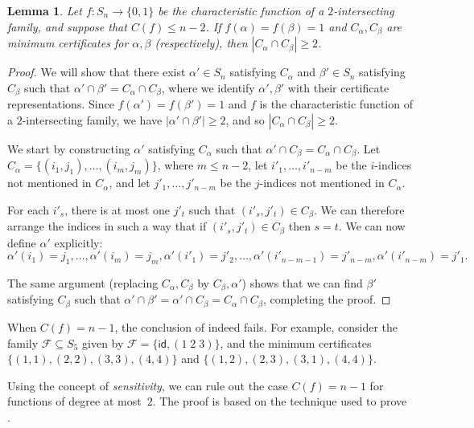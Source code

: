 \documentclass{article}
\newtheorem{lemma}[theorem]{Lemma}
\theoremstyle{definition}
\providecommand{\id}{\mathsf{id}}
\begin{document}
\begin{lemma} \label{lem:2-int-coset-sym}
Let $f\colon S_n \to \{0,1\}$ be the characteristic function of a $2$-intersecting family, and suppose that $C(f) \leq n-2$. If $f(\alpha) = f(\beta) = 1$ and $C_\alpha,C_\beta$ are minimum certificates for $\alpha,\beta$ (respectively), then $|C_\alpha \cap C_\beta| \geq 2$.
\end{lemma}
\begin{proof}
We will show that there exist $\alpha' \in S_n$ satisfying $C_\alpha$ and $\beta' \in S_n$ satisfying $C_\beta$ such that $\alpha' \cap \beta' = C_\alpha \cap C_\beta$, where we identify $\alpha',\beta'$ with their certificate representations. Since $f(\alpha') = f(\beta') = 1$ and $f$ is the characteristic function of a $2$-intersecting family, we have $|\alpha' \cap \beta'| \geq 2$, and so $|C_\alpha \cap C_\beta| \geq 2$.

We start by constructing $\alpha'$ satisfying $C_\alpha$ such that $\alpha' \cap C_\beta = C_\alpha \cap C_\beta$. Let $C_\alpha = \{(i_1,j_1),\ldots,(i_m,j_m)\}$, where $m \leq n-2$, let $i'_1,\ldots,i'_{n-m}$ be the $i$-indices not mentioned in $C_\alpha$, and let $j'_1,\ldots,j'_{n-m}$ be the $j$-indices not mentioned in $C_\alpha$.

For each $i'_s$, there is at most one $j'_t$ such that $(i'_s,j'_t) \in C_\beta$. We can therefore arrange the indices in such a way that if $(i'_s,j'_t) \in C_\beta$ then $s = t$. We can now define $\alpha'$ explicitly:
\[
 \alpha'(i_1) = j_1, \ldots, \alpha'(i_m) = j_m,
 \alpha'(i'_1) = j'_2, \ldots, \alpha'(i'_{n-m-1}) = j'_{n-m}, \alpha'(i'_{n-m}) = j'_1.
\]

The same argument (replacing $C_\alpha,C_\beta$ by $C_\beta,\alpha'$) shows that we can find $\beta'$ satisfying $C_\beta$ such that $\alpha' \cap \beta' = \alpha' \cap C_\beta = C_\alpha \cap C_\beta$, completing the proof.
\end{proof}

When $C(f) = n-1$, the conclusion of  indeed fails. For example, consider the family $\mathcal{F} \subseteq S_5$ given by $\mathcal{F} = \{ \id, (1\;2\;3) \}$, and the minimum certificates $\{(1,1),(2,2),(3,3),(4,4)\}$ and $\{(1,2),(2,3),(3,1),(4,4)\}$.

\smallskip

Using the concept of \emph{sensitivity}, we can rule out the case $C(f) = n-1$ for functions of degree at most~$2$. The proof is based on the technique used to prove \cite[Lemma 3.6]{DFLLV}.
\end{document}
